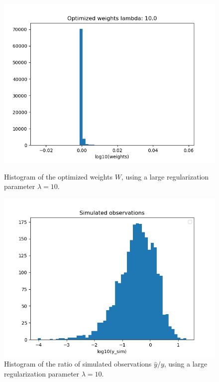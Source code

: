 \documentclass{article}
\begin{document}
\begin{figure}
	\centering
	\begin{minipage}{.48\textwidth}
		\centering
		\includegraphics[width=0.9\linewidth]{../plots/hfun_weights_lambda10.png}
		\caption{Histogram of the optimized weights $W$, using a large regularization parameter $\lambda=10$.}
		\label{fig: optimized weights lambda=10}
	\end{minipage}\hfill
	\begin{minipage}{.48\textwidth}
		\centering
		\includegraphics[width=0.9\linewidth]{../plots/hfun_simulated_observations_lambda10.png}
		\caption{Histogram of the ratio of simulated observations $\hat{y}/y$, using a large regularization parameter $\lambda=10$.}
		\label{fig: simulated observations lambda=10}
	\end{minipage}
\end{figure}
\end{document}
